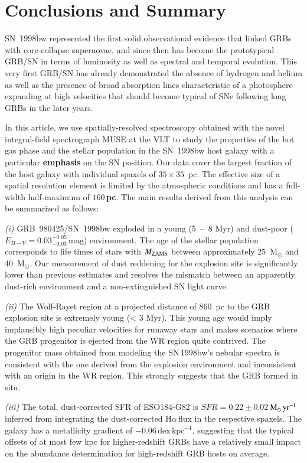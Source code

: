 \documentclass[traditabstract, referee]{aa}
\newcommand{\ha}{H$\alpha$}
\newcommand{\Msunyr}{$\mathrm{M}_\odot\,\rm{yr}^{-1}$}
\begin{document}
\section{Conclusions and Summary}

SN~1998bw represented the first solid observational evidence that linked GRBs with core-collapse supernovae, and since then has become the prototypical GRB/SN in terms of luminosity as well as spectral and temporal evolution. This very first GRB/SN has already demonstrated the absence of hydrogen and helium as well as the presence of broad absorption lines characteristic of a photosphere expanding at high velocities that should become typical of SNe following long GRBs in the later years.

In this article, we use spatially-resolved spectroscopy obtained with the novel integral-field spectrograph MUSE at the VLT to study the properties of the hot gas phase and the stellar population in the SN~1998bw host galaxy with a particular \textbf{emphasis} on the SN position. Our data cover the largest fraction of the host galaxy with individual spaxels of $35 \times 35$~pc. The effective size of a spatial resolution element is limited by the atmospheric conditions and has a full-width half-maximum of \textbf{$160$\,pc}. The main results derived from this analysis can be summarized as follows:

\textit{(i)} GRB~980425/SN~1998bw exploded in a young (5~--~8 Myr) and dust-poor ($E_{B-V} = 0.03_{-0.03}^{+0.05}\,\mathrm{mag}$) environment. The age of the stellar population corresponds to life times of stars with $M_{\rm{ZAMS}}$  between approximately 25~M$_{\odot}$ and 40~M$_{\odot}$. Our measurement of dust reddening for the explosion site is significantly lower than previous estimates and resolves the mismatch between an apparently dust-rich environment and a non-extinguished SN light curve.

\textit{(ii)} The Wolf-Rayet region at a projected distance of 860~pc to the GRB explosion site is extremely young (< 3 Myr). This young age would imply implausibly high peculiar velocities for runaway stars and makes scenarios where the GRB progenitor is ejected from the WR region quite contrived. The progenitor mass obtained from modeling the SN\,1998bw's nebular spectra \citep{2006ApJ...640..854M} is consistent with the one derived from the explosion environment and inconsistent with an origin in the WR region. This strongly suggests that the GRB formed in situ.

\textit{(iii)} The total, dust-corrected SFR of ESO184-G82 is $SFR=0.22\pm0.02$\,\Msunyr inferred from integrating the dust-corrected \ha\,flux in the respective spaxels. The galaxy has a metallicity gradient of $-0.06\,\mathrm{dex\,kpc^{-1}}$, suggesting that the typical offsets of at most few kpc for higher-redshift GRBs have a relatively small impact on the abundance determination for high-redshift GRB hosts on average.
\end{document}

